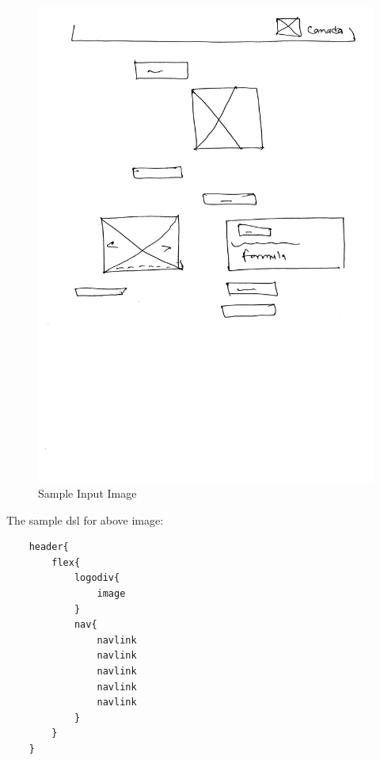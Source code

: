     \begin{figure}[H]
        \includegraphics[scale=.6, trim=30 300 0 0 ]{images/si2.jpg}
        \caption{Sample Input Image}
        \label{fig:lsam1}
    \end{figure}


The sample \gls{dsl} for above image:


\begin{verbatim}
    header{
        flex{
            logodiv{
                image
            }
            nav{
                navlink
                navlink
                navlink
                navlink
                navlink
            }
        }
    }
    \end{verbatim}

    
